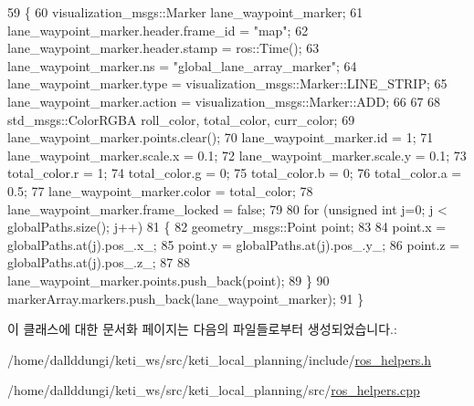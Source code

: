 \begin{DoxyCode}
59 \{
60   visualization\_msgs::Marker lane\_waypoint\_marker;
61   lane\_waypoint\_marker.header.frame\_id = \textcolor{stringliteral}{"map"};
62   lane\_waypoint\_marker.header.stamp = ros::Time();
63   lane\_waypoint\_marker.ns = \textcolor{stringliteral}{"global\_lane\_array\_marker"};
64   lane\_waypoint\_marker.type = visualization\_msgs::Marker::LINE\_STRIP;
65   lane\_waypoint\_marker.action = visualization\_msgs::Marker::ADD;
66 
67 
68   std\_msgs::ColorRGBA roll\_color, total\_color, curr\_color;
69   lane\_waypoint\_marker.points.clear();
70   lane\_waypoint\_marker.id = 1;
71   lane\_waypoint\_marker.scale.x = 0.1;
72   lane\_waypoint\_marker.scale.y = 0.1;
73   total\_color.r = 1;
74   total\_color.g = 0;
75   total\_color.b = 0;
76   total\_color.a = 0.5;
77   lane\_waypoint\_marker.color = total\_color;
78   lane\_waypoint\_marker.frame\_locked = \textcolor{keyword}{false};
79 
80   \textcolor{keywordflow}{for} (\textcolor{keywordtype}{unsigned} \textcolor{keywordtype}{int} j=0; j < globalPaths.size(); j++)
81   \{
82     geometry\_msgs::Point point;
83 
84     point.x = globalPaths.at(j).pos\_.x\_;
85     point.y = globalPaths.at(j).pos\_.y\_;
86     point.z = globalPaths.at(j).pos\_.z\_;
87 
88     lane\_waypoint\_marker.points.push\_back(point);
89   \}
90   markerArray.markers.push\_back(lane\_waypoint\_marker);
91 \}
\end{DoxyCode}


이 클래스에 대한 문서화 페이지는 다음의 파일들로부터 생성되었습니다.\+:\begin{DoxyCompactItemize}
\item 
/home/dallddungi/keti\+\_\+ws/src/keti\+\_\+local\+\_\+planning/include/\hyperlink{ros__helpers_8h}{ros\+\_\+helpers.\+h}\item 
/home/dallddungi/keti\+\_\+ws/src/keti\+\_\+local\+\_\+planning/src/\hyperlink{ros__helpers_8cpp}{ros\+\_\+helpers.\+cpp}\end{DoxyCompactItemize}

